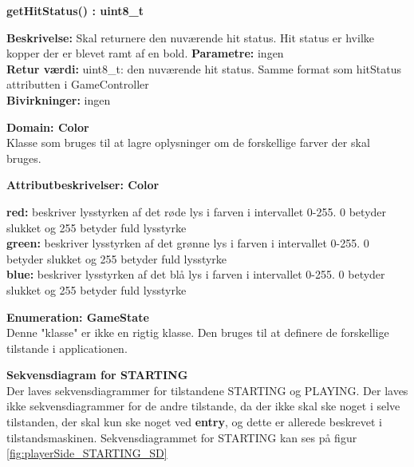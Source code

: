 \documentclass[Arkitektur/System_main.tex]{subfiles}
\begin{document}
\textbf{getHitStatus() : uint8\_t}
\begin{adjustwidth}{1cm}{0pt}
\textbf{Beskrivelse:} Skal returnere den nuværende hit status. Hit status er hvilke kopper der er blevet ramt af en bold.
\textbf{Parametre:} ingen \\[0.2cm]
\textbf{Retur værdi:} uint8\_t: den nuværende hit status. Samme format som hitStatus attributten i GameController \\[0.2cm]
\textbf{Bivirkninger:} ingen \\[0.2cm]
\end{adjustwidth}


{\large\textbf{Domain:  Color}}\\
Klasse som bruges til at lagre oplysninger om de forskellige farver der skal bruges.  

{\large\textbf{Attributbeskrivelser: Color}}
\begin{adjustwidth}{1cm}{0pt}
\textbf{red:} beskriver lysstyrken af det røde lys i farven i intervallet 0-255. 0 betyder slukket og 255 betyder fuld lysstyrke \\[0.2cm]
\textbf{green:} beskriver lysstyrken af det grønne lys i farven i intervallet 0-255. 0 betyder slukket og 255 betyder fuld lysstyrke \\[0.2cm]
\textbf{blue:} beskriver lysstyrken af det blå lys i farven i intervallet 0-255. 0 betyder slukket og 255 betyder fuld lysstyrke \\[0.2cm]
\end{adjustwidth}

{\large\textbf{Enumeration:  GameState}}\\
Denne "klasse" er ikke en rigtig klasse. Den bruges til at definere de forskellige tilstande i applicationen. 

{\large\textbf{Sekvensdiagram for STARTING}}\\
Der laves sekvensdiagrammer for tilstandene STARTING og PLAYING. Der laves ikke sekvensdiagrammer for de andre tilstande, da der ikke skal ske noget i selve tilstanden, der skal kun ske noget ved \textbf{entry}, og dette er allerede beskrevet i tilstandsmaskinen. Sekvensdiagrammet for STARTING kan ses på figur \ref{fig:playerSide_STARTING_SD}
\end{document}
